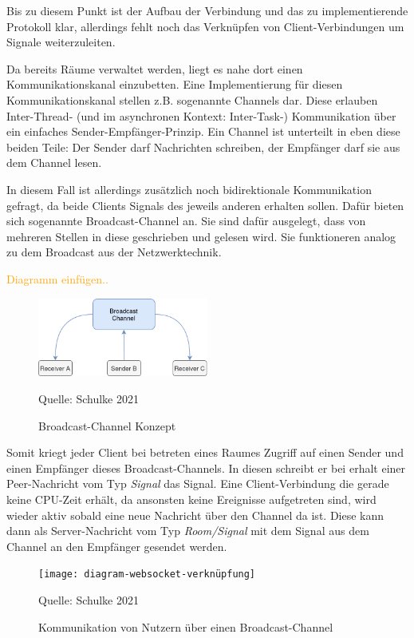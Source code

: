 \documentclass{article}
\newcommand{\figuresource}[1]{
	\begin{center}Quelle: #1\end{center}
}
\begin{document}
\begin{onecolumn}
Bis zu diesem Punkt ist der Aufbau der Verbindung und das zu implementierende
Protokoll klar, allerdings fehlt noch das Verknüpfen von Client-Verbindungen um
Signale weiterzuleiten.

Da bereits Räume verwaltet werden, liegt es nahe dort einen Kommunikationskanal
einzubetten. Eine Implementierung für diesen Kommunikationskanal stellen z.B.
sogenannte Channels dar. Diese erlauben Inter-Thread- (und im asynchronen
Kontext: Inter-Task-) Kommunikation über ein einfaches
Sender-Empfänger-Prinzip. Ein Channel ist unterteilt in eben diese beiden
Teile: Der Sender darf Nachrichten schreiben, der Empfänger darf sie aus dem
Channel lesen.

In diesem Fall ist allerdings zusätzlich noch bidirektionale Kommunikation
gefragt, da beide Clients Signals des jeweils anderen erhalten sollen. Dafür
bieten sich sogenannte Broadcast-Channel an. Sie sind dafür ausgelegt, dass von
mehreren Stellen in diese geschrieben und gelesen wird. Sie funktioneren analog
zu dem Broadcast aus der Netzwerktechnik.

\textcolor{orange}{Diagramm einfügen..}

\begin{figure}[ht]
	\includegraphics[width=0.5\textwidth]{diagram-broadcast}
	\centering
	\caption{Broadcast-Channel Konzept}
	\figuresource{Schulke 2021}
\end{figure}

Somit kriegt jeder Client bei betreten eines Raumes Zugriff auf einen Sender
und einen Empfänger dieses Broadcast-Channels. In diesen schreibt er bei erhalt
einer Peer-Nachricht vom Typ \textit{Signal} das Signal. Eine Client-Verbindung
die gerade keine CPU-Zeit erhält, da ansonsten keine Ereignisse aufgetreten
sind, wird wieder aktiv sobald eine neue Nachricht über den Channel da ist.
Diese kann dann als Server-Nachricht vom Typ \textit{Room/Signal} mit dem
Signal aus dem Channel an den Empfänger gesendet werden.

\begin{figure}[ht]
	\texttt{[image: diagram-websocket-verknüpfung]}
	\centering
	\caption{Kommunikation von Nutzern über einen Broadcast-Channel}
	\figuresource{Schulke 2021}
\end{figure}


\end{onecolumn}
\end{document}
